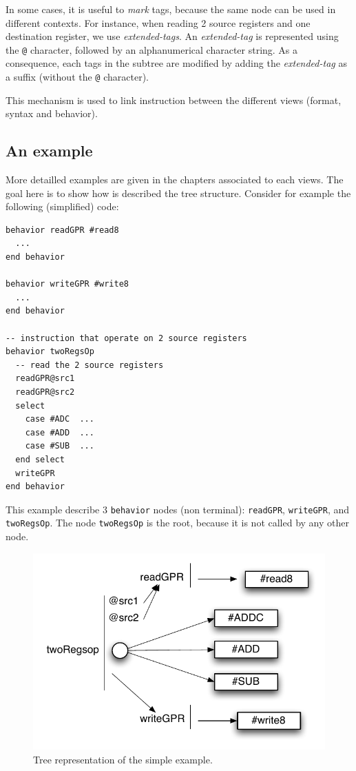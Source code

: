 In some cases, it is useful to \emph{mark} tags, because the same node can be used in different contexts. For instance, when reading 2 source registers and one destination register, we use \emph{extended-tags}. An \emph{extended-tag} is represented using the \texttt{@} character, followed by an alphanumerical character string. As a consequence, each tags in the subtree are modified by adding the \emph{extended-tag} as a suffix (without the \texttt{@} character).

This mechanism is used to link instruction between the different views (format, syntax and behavior).

\subsection{An example}
\label{exempleSignature}
More detailled examples are given in the chapters associated to each views. The goal here is to show how is described the tree structure.
Consider for example the following (simplified) code:

\begin{lstlisting}
behavior readGPR #read8
  ...
end behavior

behavior writeGPR #write8
  ...
end behavior

-- instruction that operate on 2 source registers
behavior twoRegsOp
  -- read the 2 source registers
  readGPR@src1
  readGPR@src2
  select
    case #ADC  ...
    case #ADD  ...
    case #SUB  ...
  end select
  writeGPR
end behavior
\end{lstlisting}
This example describe 3 \texttt{behavior} nodes (non terminal):  \texttt{readGPR}, \texttt{writeGPR}, and \texttt{twoRegsOp}. The node \texttt{twoRegsOp} is the root, because it is not called by any other node. 

\begin{figure}		%
  \begin{center}
    \includegraphics[width=0.8 \linewidth]{../common/images/instBase.pdf}
    \caption{Tree representation of the simple example.}
    \label{fig:instBase}
  \end{center}
\end{figure}

